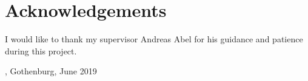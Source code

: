\thispagestyle{plain}			%

\section*{Acknowledgements}
	I would like to thank my supervisor Andreas Abel for his guidance and
	patience during this project.

\vspace{1.5cm}
\hfill
\me, Gothenburg, June 2019

\newpage				%
\thispagestyle{empty}
\mbox{}
